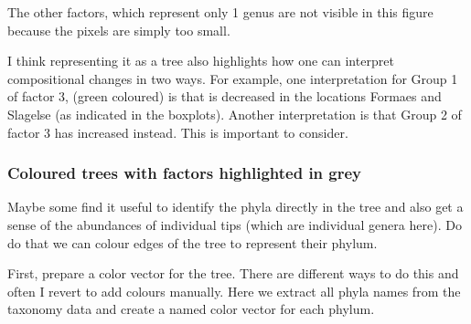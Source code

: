 \documentclass[
]{book}
\newenvironment{Shaded}{\begin{snugshade}}{\end{snugshade}}
\newcommand{\AttributeTok}[1]{\textcolor[rgb]{0.77,0.63,0.00}{#1}}
\newcommand{\CommentTok}[1]{\textcolor[rgb]{0.56,0.35,0.01}{\textit{#1}}}
\newcommand{\DecValTok}[1]{\textcolor[rgb]{0.00,0.00,0.81}{#1}}
\newcommand{\DocumentationTok}[1]{\textcolor[rgb]{0.56,0.35,0.01}{\textbf{\textit{#1}}}}
\newcommand{\FunctionTok}[1]{\textcolor[rgb]{0.00,0.00,0.00}{#1}}
\newcommand{\NormalTok}[1]{#1}
\newcommand{\OtherTok}[1]{\textcolor[rgb]{0.56,0.35,0.01}{#1}}
\newcommand{\SpecialCharTok}[1]{\textcolor[rgb]{0.00,0.00,0.00}{#1}}
\begin{document}
The other factors, which represent only 1 genus are not visible in this figure because the pixels are simply too small.

I think representing it as a tree also highlights how one can interpret compositional changes in two ways. For example, one interpretation for Group 1 of factor 3, (green coloured) is that is decreased in the locations Formaes and Slagelse (as indicated in the boxplots). Another interpretation is that Group 2 of factor 3 has increased instead. This is important to consider.

\hypertarget{coloured-trees-with-factors-highlighted-in-grey}{%
\subsubsection{Coloured trees with factors highlighted in grey}\label{coloured-trees-with-factors-highlighted-in-grey}}

Maybe some find it useful to identify the phyla directly in the tree and also get a sense of the abundances of individual tips (which are individual genera here). Do do that we can colour edges of the tree to represent their phylum.

First, prepare a color vector for the tree. There are different ways to do this and often I revert to add colours manually. Here we extract all phyla names from the taxonomy data and create a named color vector for each phylum.

\begin{Shaded}
\end{Shaded}
\end{document}
